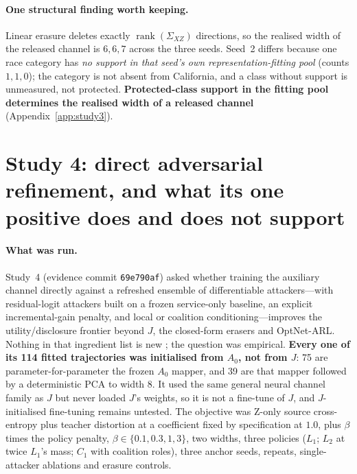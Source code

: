 \documentclass[10pt]{article}
\begin{document}
\paragraph{One structural finding worth keeping.} Linear erasure deletes exactly
$\operatorname{rank}(\Sigma_{XZ})$ directions, so the realised width of the released channel is
$6,6,7$ across the three seeds. Seed~2 differs because one race category has \emph{no support in that
seed's own representation-fitting pool} (counts $1,1,0$); the category is not absent from California,
and a class without support is unmeasured, not protected. \textbf{Protected-class support in the
fitting pool determines the realised width of a released channel} (Appendix~\ref{app:study3}).

\section{Study 4: direct adversarial refinement, and what its one positive does and does not support}
\label{sec:study4}

\paragraph{What was run.} Study~4 (evidence commit \texttt{69e790af}) asked whether training the
auxiliary channel directly against a refreshed ensemble of differentiable attackers---with residual-logit
attackers built on a frozen service-only baseline, an explicit incremental-gain penalty, and local or
coalition conditioning---improves the utility/disclosure frontier beyond $J$, the closed-form erasers and
OptNet-ARL. Nothing in that ingredient list is new \citep{madras2018laftr,belrose2023leace}; the question
was empirical. \textbf{Every one of its 114 fitted trajectories was initialised from $A_0$, not from $J$}:
75 are parameter-for-parameter the frozen $A_0$ mapper, and 39 are that mapper followed by a deterministic
PCA to width 8. It used the same general neural channel family as $J$ but never loaded $J$'s weights, so
it is not a fine-tune of $J$, and $J$-initialised fine-tuning remains untested. The objective was Z-only
source cross-entropy plus teacher distortion at a coefficient fixed by specification at $1.0$, plus
$\beta$ times the policy penalty, $\beta\in\{0.1,0.3,1,3\}$, two widths, three policies ($L_1$; $L_2$
at twice $L_1$'s mass; $C_1$ with coalition roles), three anchor seeds, repeats, single-attacker ablations
and erasure controls.

\begin{table}[t]
\centering\scriptsize

\caption{Study~4 on the 2018 development pools. The best new arm, \texttt{dax8\_C1\_b300}, is
significantly worse than $J$ on $AB$/RAC1P under both weightings and significantly worse than
\texttt{leace\_A0} on $AB$/SEX, and significantly better than no comparator on any sensitive endpoint.
\noteStudyFourFrontier}
\label{tab:s4frontier}
\end{table}
\end{document}
